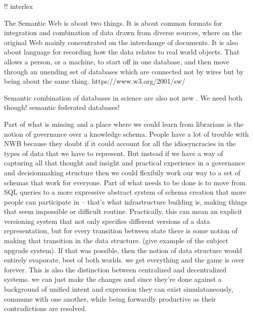\documentclass{article}
\begin{document}
!! interlex

\begin{leftbar}
The Semantic Web is about two things. It is about common formats for
integration and combination of data drawn from diverse sources, where on
the original Web mainly concentrated on the interchange of documents. It
is also about language for recording how the data relates to real world
objects. That allows a person, or a machine, to start off in one
database, and then move through an unending set of databases which are
connected not by wires but by being about the same thing.
https://www.w3.org/2001/sw/
\end{leftbar}

Semantic combination of databases in science are also not new \cite{
cheungSemanticWebApproach2007, simaEnablingSemanticQueries2019}. We
need both though! semantic federated databases!

Part of what is missing and a place where we could learn from librarians
is the notion of governance over a knowledge schema. People have a lot
of trouble with NWB because they doubt if it could account for all the
idiosyncracies in the types of data that we have to represent. But
instead if we have a way of capturing all that thought and insight and
practical experience in a governance and decisionmaking structure then
we could flexibily work our way to a set of schemas that work for
everyone. Part of what needs to be done is to move from SQL queries to a
more expressive abstract system of schema creation that more people can
participate in -- that's what infrastructure building is, making things
that seem impossible or difficult routine. Practically, this can mean an
explicit versioning system that not only specifies different versions of
a data representation, but for every transition between state there is
some notion of making that transition in the data structure. (give
example of the subject upgrade system). If that was possible, then the
notion of data structure would entirely evaporate, best of both worlds.
we get everything and the game is over forever. This is also the
distinction between centralized and decentralized systems. we can just
make the changes and since they're done against a background of unified
intent and expression they can exist simulataneously, commune with one
another, while being forwardly productive as their contradictions are
resolved.
\end{document}
